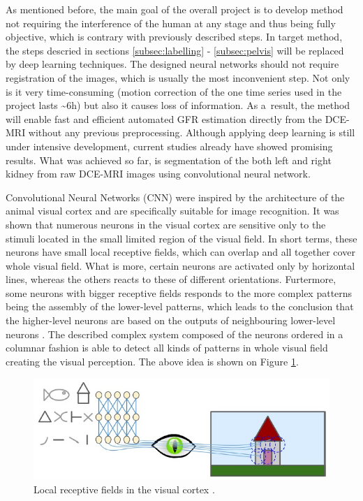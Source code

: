 As mentioned before, the main goal of the overall project is to develop method not requiring the interference of the human at any stage and thus being fully objective, which is contrary with previously described steps. In target method, the steps descried in sections \ref{subsec:labelling} - \ref{subsec:pelvis} will be replaced by deep learning techniques. The designed neural networks should not require registration of the images, which is usually the most inconvenient step. Not only is it very time-consuming (motion correction of the one time series used in the project lasts \textasciitilde 6h) but also it causes loss of information. As a~result, the method will enable fast and efficient automated GFR estimation directly from the DCE-MRI without any previous preprocessing.
Although applying deep learning is still under intensive development, current studies already have showed promising results. What was achieved so far, is segmentation of the both left and right kidney from raw DCE-MRI images using convolutional neural network. 

Convolutional Neural Networks (CNN) were inspired by the architecture of the animal visual cortex and are specifically suitable for image recognition. It was shown that numerous neurons in the visual cortex are sensitive only to the stimuli located in the small limited region of the visual field. In short terms, these neurons have small local receptive fields, which can overlap and all together cover whole visual field. What is more, certain neurons are activated only by horizontal lines, whereas the others reacts to these of different orientations.
Furtermore, some neurons with bigger receptive fields responds to the more complex patterns being the assembly of the lower-level patterns, which leads to the conclusion that the higher-level neurons are based on the outputs of neighbouring lower-level neurons \cite{hubel1968receptive,handson}.  The described complex system composed of the neurons ordered in a columnar fashion is able to detect all kinds of patterns in whole visual field creating the visual perception. The above idea is shown on Figure \ref{fig:visual_cortex}. 
 

\begin{figure}
	\centering
	\includegraphics[width = \linewidth]{img/visual_cortex}
	\caption{Local receptive fields in the visual cortex \cite{handson}.}
	\label{fig:visual_cortex}
\end{figure}

